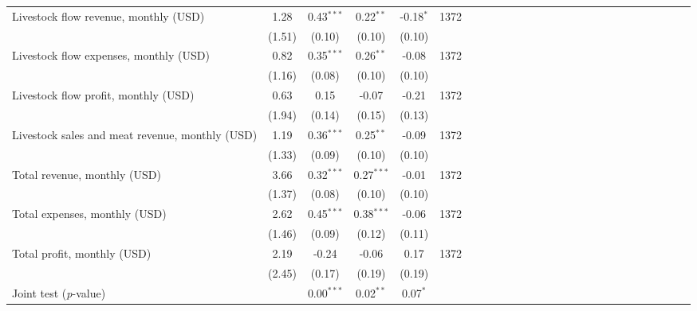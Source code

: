 {\begin{tabular}{l*{5}{SSSSc}}
Livestock flow revenue, monthly (USD)&     1.28&0.43$^{***}$&0.22$^{**}$&-0.18$^{*}$&     1372\\
          &   (1.51)&   (0.10)&   (0.10)&   (0.10)&         \\
Livestock flow expenses, monthly (USD)&     0.82&0.35$^{***}$&0.26$^{**}$&    -0.08&     1372\\
          &   (1.16)&   (0.08)&   (0.10)&   (0.10)&         \\
Livestock flow profit, monthly (USD)&     0.63&     0.15&    -0.07&    -0.21&     1372\\
          &   (1.94)&   (0.14)&   (0.15)&   (0.13)&         \\
Livestock sales and meat revenue, monthly (USD)&     1.19&0.36$^{***}$&0.25$^{**}$&    -0.09&     1372\\
          &   (1.33)&   (0.09)&   (0.10)&   (0.10)&         \\
Total revenue, monthly (USD)&     3.66&0.32$^{***}$&0.27$^{***}$&    -0.01&     1372\\
          &   (1.37)&   (0.08)&   (0.10)&   (0.10)&         \\
Total expenses, monthly (USD)&     2.62&0.45$^{***}$&0.38$^{***}$&    -0.06&     1372\\
          &   (1.46)&   (0.09)&   (0.12)&   (0.11)&         \\
Total profit, monthly (USD)&     2.19&    -0.24&    -0.06&     0.17&     1372\\
          &   (2.45)&   (0.17)&   (0.19)&   (0.19)&         \\
\midrule Joint test (\emph{p}-value)&         &{0.00$^{***}$}&{0.02$^{**}$}&{0.07$^{*}$}&         \\
\bottomrule
\end{tabular}
}
